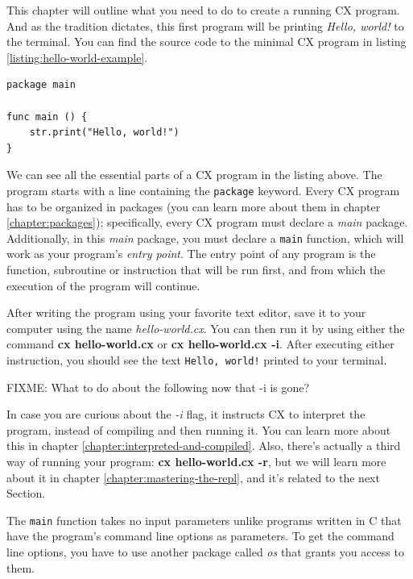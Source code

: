 \documentclass[11pt,fleqn,openany]{book} %
\begin{document}
This chapter will outline what you need to do to create a running CX program.
And as the tradition dictates, this first program will be printing \emph{Hello, world!} to the terminal. You can find the source code to the minimal CX program in listing \ref{listing:hello-world-example}.

\begin{lstlisting}[caption={"Hello, world!" example},captionpos=b,label={listing:hello-world-example}]
package main

func main () {
 	str.print("Hello, world!")
}
\end{lstlisting}

We can see all the essential parts of a CX program in the listing above. The program starts with a line containing the \texttt{package} keyword. Every CX program has to be organized in packages (you can learn more about them in chapter \ref{chapter:packages}); specifically, every CX program must declare a \emph{main} package. Additionally, in this \emph{main} package, you must declare a \texttt{main} function, which will work as your program's \emph{entry point}. The entry point of any program is the function, subroutine or instruction that will be run first, and from which the execution of the program will continue.

After writing the program using your favorite text editor, save it to your computer using the name \emph{hello-world.cx}. You can then run it by using either the command \textbf{cx hello-world.cx} or \textbf{cx hello-world.cx -i}. After executing either instruction, you should see the text \texttt{Hello, world!} printed to your terminal.

FIXME: What to do about the following now that -i is gone?

In case you are curious about the \emph{-i} flag, it instructs CX to interpret the program, instead of compiling and then running it. You can learn more about this in chapter \ref{chapter:interpreted-and-compiled}. Also, there's actually a third way of running your program: \textbf{cx hello-world.cx -r}, but we will learn more about it in chapter \ref{chapter:mastering-the-repl}, and it's related to the next Section.

The \texttt{main} function takes no input parameters unlike programs written in C that have the program's command line options as parameters. To get the command line options, you have to use another package called \emph{os} that grants you access to them.
\end{document}
